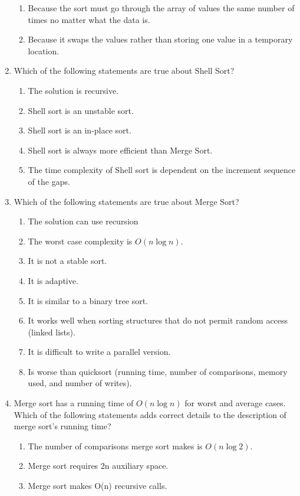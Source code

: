 \documentclass{article}
\begin{document}
\begin{enumerate}
\begin{enumerate}[label=\alph*.]
			\item Because the sort must go through the array of values the same number of times no matter what the data is.
			\item Because it swaps the values rather than storing one value in a temporary location.
		\end{enumerate}
	\newpage
	\item Which of the following statements are true about Shell Sort?
		\begin{enumerate}[label=\alph*.]
			\item The solution is recursive.
			\item Shell sort is an unstable sort.
			\item Shell sort is an in-place sort.
			\item Shell sort is always more efficient than Merge Sort.
			\item The time complexity of Shell sort is dependent on the increment sequence of the gaps.
		\end{enumerate}
	\item Which of the following statements are true about Merge Sort?
		\begin{enumerate}[label=\alph*.]
			\item The solution can use recursion
			\item The worst case complexity is \(O(n \log n)\).
			\item It is not a stable sort.
			\item It is adaptive.
			\item It is similar to a binary tree sort.
			\item It works well when sorting structures that do not permit random access (linked lists).
			\item It is difficult to write a parallel version.
			\item Is worse than quicksort (running time, number of comparisons, memory used, and number of writes).
		\end{enumerate}
	\item Merge sort has a running time of \(O(n \log n)\) for worst and average cases. Which of the following statements adds correct details to the description of merge sort's running time?
		\begin{enumerate}[label=\alph*.]
			\item The number of comparisons merge sort makes is \(O(n \log 2)\).
			\item Merge sort requires 2n auxiliary space.
			\item Merge sort makes O(n) recursive calls.

\end{enumerate}
\end{enumerate}
\end{document}
